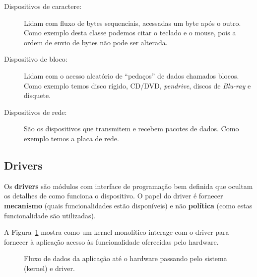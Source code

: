 \begin{description}
\item[Dispositivos de caractere:] Lidam com fluxo de bytes
  sequenciais, acessadas um byte após o outro. Como exemplo desta
  classe podemos citar o teclado e o mouse, pois a ordem de envio de
  bytes não pode ser alterada.
\item[Dispositivo de bloco:] Lidam com o acesso aleatório
  de ``pedaços'' de dados chamados blocos. Como exemplo temos disco
  rígido, CD/DVD, {\em pendrive}, discos de {\em Blu-ray} e disquete.
\item[Dispositivos de rede:] São os dispositivos que transmitem e
  recebem pacotes de dados. Como exemplo temos a placa de rede.
\end{description}

\subsection{Drivers}

Os {\bf drivers} são módulos com interface de programação bem definida
que ocultam os detalhes de como funciona o dispositivo. O papel do
driver é fornecer {\bf mecanismo} (quais funcionalidades estão
disponíveis) e não {\bf política} (como estas funcionalidade são
utilizadas).

A Figura~\ref{fig:driver} mostra como um kernel monolítico interage
com o driver para fornecer à aplicação acesso às funcionalidade
oferecidas pelo hardware.

\begin{figure}[ht]
  \centering
    
  \caption{Fluxo de dados da aplicação até o hardware passando pelo sistema (kernel) e driver.}
  \label{fig:driver}
\end{figure}

